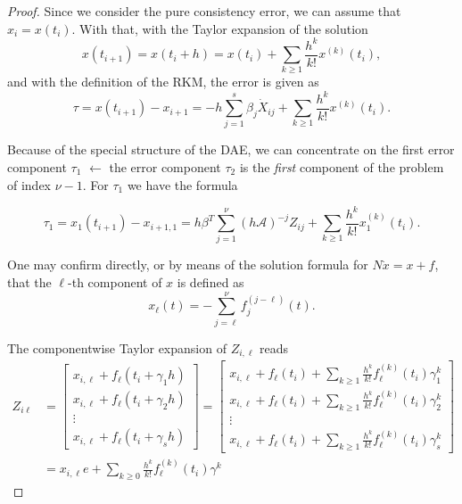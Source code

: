 \documentclass[]{book}
\theoremstyle{definition}
\theoremstyle{definition}
\theoremstyle{definition}
\theoremstyle{definition}
\theoremstyle{remark}
\begin{document}
\begin{proof}
{}Since we consider the pure consistency error, we can assume that \(x_i=x(t_i)\). With that, with the Taylor expansion of the solution
\[
x(t_{i+1}) = x(t_i+h) = x(t_i) + \sum_{k\geq 1} \frac{h^k}{k!}x^{(k)}(t_i),
\]
and with the definition of the RKM, the error is given as
\[
\tau = x(t_{i+1}) - x_{i+1} = -h\sum_{j=1}^s \beta_j \dot X_{ij} + \sum_{k\geq 1} \frac{h^k}{k!}x^{(k)}(t_i).
\]

Because of the special structure of the DAE, we can concentrate on the first error component \(\tau_1\) \(\leftarrow\) the error component \(\tau_2\) is the \emph{first} component of the problem of index \(\nu-1\). For \(\tau_1\) we have the formula

\[
\tau_1 = x_1(t_{i+1}) - x_{i+1,1} = h\beta^T\sum_{j=1}^\nu (h\mathcal A)^{-j}Z_{ij} + \sum_{k\geq 1} \frac{h^k}{k!}x_1^{(k)}(t_i).
\]

One may confirm directly, or by means of the solution formula for \(N\dot x = x + f\), that the \(\ell\)-th component of \(x\) is defined as
\[
x_\ell(t) = - \sum_{j=\ell}^{\nu}f_j^{(j-\ell)}(t).
\]

The componentwise Taylor expansion of \(Z_{i,\ell}\) reads
\begin{align*}
Z_{i\ell} 
&= 
\begin{bmatrix}
x_{i,\ell} + f_\ell(t_i+\gamma_1 h) \\
x_{i,\ell} + f_\ell(t_i+\gamma_2 h) \\
\vdots \\
x_{i,\ell} + f_\ell(t_i+\gamma_s h) 
\end{bmatrix}
=
\begin{bmatrix}
    x_{i,\ell} + f_\ell(t_i) + \sum_{k\geq 1}\frac{h^k}{k!}f_\ell^{(k)}(t_i)\gamma_1^k \\
  x_{i,\ell} + f_\ell(t_i) + \sum_{k\geq 1}\frac{h^k}{k!}f_\ell^{(k)}(t_i)\gamma_2 ^k \\
\vdots \\
  x_{i,\ell} + f_\ell(t_i) + \sum_{k\geq 1}\frac{h^k}{k!}f_\ell^{(k)}(t_i)\gamma_s ^k 
\end{bmatrix} \\
&=
x_{i,\ell}e+\sum_{k\geq 0} \frac{h^k}{k!}f_\ell^{(k)}(t_i)\gamma^k
\end{align*}


\end{proof}
\end{document}
